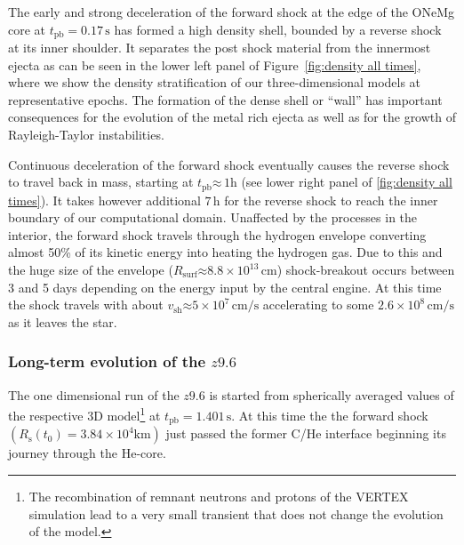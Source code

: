 \documentclass[fleqn,usenatbib]{mnras}
\newcommand{\tpb}{\ensuremath{t_{\text{pb}}}}
\renewcommand{\sec}{\xspace\ensuremath{\text{s}}}
\newcommand{\vertex}{\textsc{V{\footnotesize ERTEX}}\xspace}
\begin{document}
The early and strong deceleration of the forward shock at the edge of the ONeMg core at $\tpb=0.17\,\text{s}$ has formed a high density shell, bounded by a reverse shock at its inner shoulder. It separates the post shock material from the innermost ejecta as can be seen in the lower left panel of Figure~\ref{fig:density all times}, where we show the density stratification of our three-dimensional models at representative epochs. The formation of the dense shell or ``wall'' \cite{Kifonidis2006} has important consequences for the evolution of the metal rich ejecta as well as for the growth of Rayleigh-Taylor instabilities. 

Continuous deceleration of the forward shock eventually causes the reverse shock to travel back in mass, starting at  $\tpb\mathord{\approx}\,1\text{h}$ (see lower right panel of \ref{fig:density all times}). It takes however additional $7\,\text{h}$ for the reverse shock to reach the inner boundary of our computational domain. 
Unaffected by the processes in the interior, the forward shock travels through the hydrogen envelope converting almost 50\% of its kinetic energy into heating the hydrogen gas. Due to this and the huge size of the envelope ($R_{\mathrm{surf}}\mathord{\approx}8.8\times10^{13}\,\mathrm{cm}$) shock-breakout occurs between 3 and 5 days depending on the energy input by the central engine. At this time the shock travels with about $v_{\mathrm{sh}}\mathord{\approx} 5\times 10^{7}\, \mathrm{cm/s}$ accelerating to some $2.6\times 10^{8}\, \mathrm{cm/s}$ as it leaves the star.

\subsubsection{Long-term evolution of the $z9.6$}
\label{sec:Long term evolution of the z9.6 model}
The one dimensional run of the $z9.6$ is started from spherically averaged values of the respective 3D model\footnote{The recombination of remnant neutrons and protons of the \vertex simulation lead to a very small transient that does not change the evolution of the model.} at $\tpb=1.401\,\sec$. At this time the the forward shock $(R_{\text{s}}(t_0) = 3.84\times 10^4 \mathrm{km})$ just passed the former C/He interface beginning its journey through the He-core.
\end{document}

